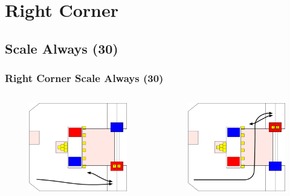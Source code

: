 \documentclass{beamer}
\begin{document}
\section{Right Corner}
\subsection{Scale Always (30)}

\begin{frame}
 \frametitle{Right Corner Scale Always \alert{(30)}}
 \begin{columns}
  \begin{figure}
   \includegraphics[scale=0.15]{assets/paths/30_LR}
  \end{figure}
  \begin{figure}
   \includegraphics[scale=0.15]{assets/paths/30_RL}

\end{figure}
\end{columns}
\end{frame}
\end{document}
